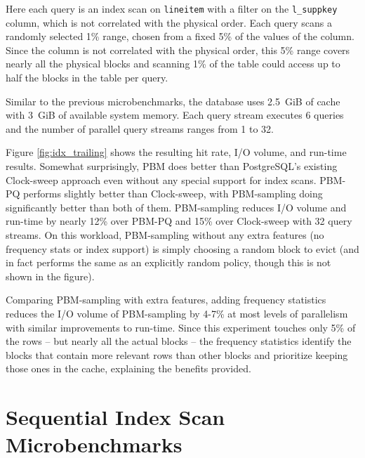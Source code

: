 Here each query is an index scan on \verb|lineitem| with a filter on the \verb|l_suppkey| column, which is not correlated with the physical order. Each query scans a randomly selected 1\% range, chosen from a fixed 5\% of the values of the column. Since the column is not correlated with the physical order, this 5\% range covers nearly all the physical blocks and scanning 1\% of the table could access up to half the blocks in the table per query.

Similar to the previous microbenchmarks, the database uses 2.5~GiB of cache with 3~GiB of available system memory. Each query stream executes 6 queries and the number of parallel query streams ranges from 1 to 32.


Figure \ref{fig:idx_trailing} shows the resulting hit rate, I/O volume, and run-time results. Somewhat surprisingly, PBM does better than PostgreSQL's existing Clock-sweep approach even without any special support for index scans. PBM-PQ performs slightly better than Clock-sweep, with PBM-sampling doing significantly better than both of them. PBM-sampling reduces I/O volume and run-time by nearly 12\% over PBM-PQ and 15\% over Clock-sweep with 32 query streams. On this workload, PBM-sampling without any extra features (no frequency stats or index support) is simply choosing a random block to evict (and in fact performs the same as an explicitly random policy, though this is not shown in the figure). 

Comparing PBM-sampling with extra features, adding frequency statistics reduces the I/O volume of PBM-sampling by 4-7\% at most levels of parallelism with similar improvements to run-time. Since this experiment touches only 5\% of the rows -- but nearly all the actual blocks -- the frequency statistics identify the blocks that contain more relevant rows than other blocks and prioritize keeping those ones in the cache, explaining the benefits provided.




\section{Sequential Index Scan Microbenchmarks}

